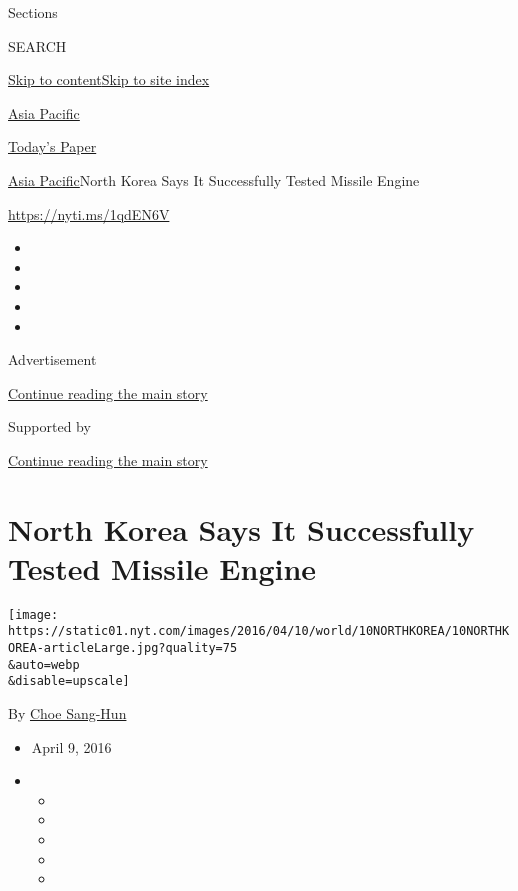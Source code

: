 Sections

SEARCH

\protect\hyperlink{site-content}{Skip to
content}\protect\hyperlink{site-index}{Skip to site index}

\href{https://www.nytimes.com/section/world/asia}{Asia Pacific}

\href{https://myaccount.nytimes.com/auth/login?response_type=cookie\&client_id=vi}{}

\href{https://www.nytimes.com/section/todayspaper}{Today's Paper}

\href{/section/world/asia}{Asia Pacific}\textbar{}North Korea Says It
Successfully Tested Missile Engine

\url{https://nyti.ms/1qdEN6V}

\begin{itemize}
\item
\item
\item
\item
\item
\end{itemize}

Advertisement

\protect\hyperlink{after-top}{Continue reading the main story}

Supported by

\protect\hyperlink{after-sponsor}{Continue reading the main story}

\hypertarget{north-korea-says-it-successfully-tested-missile-engine}{%
\section{North Korea Says It Successfully Tested Missile
Engine}\label{north-korea-says-it-successfully-tested-missile-engine}}

\texttt{[image: https://static01.nyt.com/images/2016/04/10/world/10NORTHKOREA/10NORTHKOREA-articleLarge.jpg?quality=75\\\&auto=webp\\\&disable=upscale]}

By \href{http://www.nytimes.com/by/choe-sang-hun}{Choe Sang-Hun}

\begin{itemize}
\item
  April 9, 2016
\item
  \begin{itemize}
  \item
  \item
  \item
  \item
  \item
  \end{itemize}
\end{itemize}

